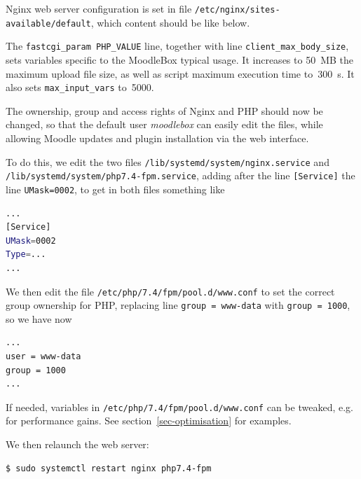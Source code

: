 \documentclass[12pt]{article}
\begin{document}
Nginx web server configuration is set in file \lstinline{/etc/nginx/sites-available/default}, which content should be like below.


The \lstinline{fastcgi_param PHP_VALUE} line, together with line \lstinline{client_max_body_size}, sets variables specific to the MoodleBox typical usage.
It increases to 50~MB the maximum upload file size, as well as script maximum execution time to~300~s.
It also sets \lstinline{max_input_vars} to~5000.

The ownership, group and access rights of Nginx and PHP should now be changed, so that the default user \emph{moodlebox} can easily edit the files, while allowing Moodle updates and plugin installation via the web interface.

To do this, we edit the two files \lstinline{/lib/systemd/system/nginx.service} and \lstinline{/lib/systemd/system/php7.4-fpm.service}, adding after the line \lstinline{[Service]} the line \lstinline{UMask=0002}, to get in both files something like
\begin{lstlisting}[language=bash]
...
[Service]
UMask=0002
Type=...
...
\end{lstlisting}
We then edit the file \lstinline{/etc/php/7.4/fpm/pool.d/www.conf} to set the correct group ownership for PHP, replacing line \lstinline{group = www-data} with \lstinline{group = 1000}, so we have now
\begin{lstlisting}[language=bash]
...
user = www-data
group = 1000
...
\end{lstlisting}
If needed, variables in \lstinline{/etc/php/7.4/fpm/pool.d/www.conf} can be tweaked, e.g. for performance gains. See section~\ref{sec-optimisation} for examples.

We then relaunch the web server:
\begin{lstlisting}[language=bash]
$ sudo systemctl restart nginx php7.4-fpm
\end{lstlisting}

\end{document}
